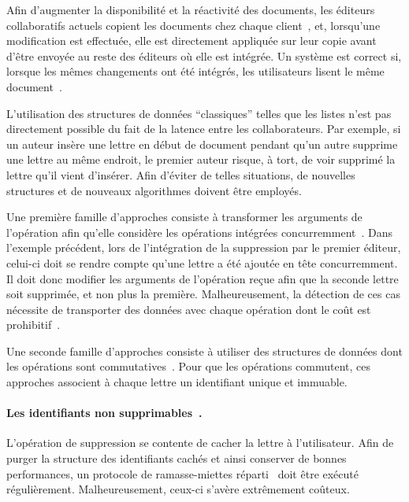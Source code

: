 Afin d'augmenter la disponibilité et la réactivité des documents, les éditeurs
collaboratifs actuels copient les documents chez chaque
client~\cite{saito2005optimistic}, et, lorsqu'une modification est effectuée,
elle est directement appliquée sur leur copie avant d'être envoyée au reste des
éditeurs où elle est intégrée. Un système est correct si, lorsque les mêmes
changements ont été intégrés, les utilisateurs lisent le même
document~\cite{burckhardt2014replicated, shapiro2011conflict}.

L'utilisation des structures de données ``classiques'' telles que les listes
n'est pas directement possible du fait de la latence entre les
collaborateurs. Par exemple, si un auteur insère une lettre en début de document
pendant qu'un autre supprime une lettre au même endroit, le premier auteur
risque, à tort, de voir supprimé la lettre qu'il vient d'insérer. Afin
d'éviter de telles situations, de nouvelles structures et de nouveaux
algorithmes doivent être employés.

Une première famille d'approches consiste à transformer les arguments de
l'opération afin qu'elle considère les opérations intégrées
concurremment~\cite{sun1998operational}. Dans l'exemple précédent, lors de
l'intégration de la suppression par le premier éditeur, celui-ci doit se rendre
compte qu'une lettre a été ajoutée en tête concurremment. Il doit donc modifier
les arguments de l'opération reçue afin que la seconde lettre soit supprimée, et
non plus la première. Malheureusement, la détection de ces cas nécessite de
transporter des données avec chaque opération dont le coût est
prohibitif~\cite{sun2009contextbased}.

Une seconde famille d'approches consiste à utiliser des structures de données
dont les opérations sont commutatives~\cite{shapiro2011conflict}. Pour que les
opérations commutent, ces approches associent à chaque lettre un identifiant
unique et immuable.

\paragraph{Les identifiants non supprimables~\cite{oster2006data}.} L'opération
de suppression se contente de cacher la lettre à l'utilisateur. Afin de purger
la structure des identifiants cachés et ainsi conserver de bonnes performances,
un protocole de ramasse-miettes réparti~\cite{abdullahi1998garbage} doit être
exécuté régulièrement. Malheureusement, ceux-ci s'avère extrêmement coûteux.

